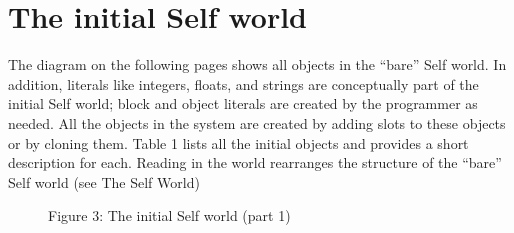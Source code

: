 \documentclass[letterpaper,10pt,english]{sphinxmanual}
\begin{document}
\section{The initial Self world}
\label{vmref:index-32}\label{vmref:the-initial-self-world}
The diagram on the following pages shows all objects in the “bare” Self world. In addition, literals
like integers, floats, and strings are conceptually part of the initial Self world; block and object
literals are created by the programmer as needed. All the objects in the system are created by adding
slots to these objects or by cloning them. Table 1 lists all the initial objects and provides a short
description for each. Reading in the world rearranges the structure of the “bare” Self world (see
The Self World)
\begin{figure}[htbp]\begin{flushleft}
\capstart

\caption{Figure 3: The initial Self world (part 1)}\end{flushleft}\end{figure}
\end{document}
